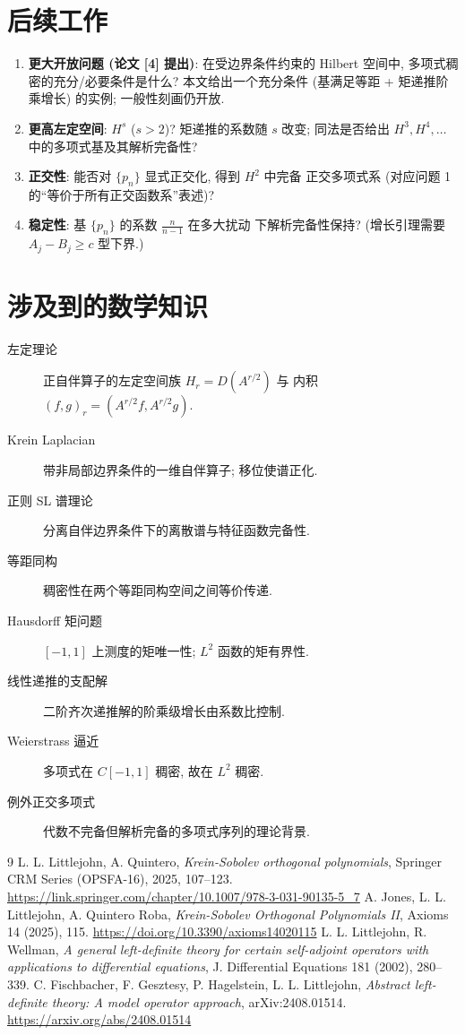 \documentclass[UTF8]{ctexart}
\begin{document}
\section{后续工作}

\begin{enumerate}
	\item \textbf{更大开放问题 (论文 [4] 提出)}: 在受边界条件约束的 Hilbert
		空间中, 多项式稠密的充分/必要条件是什么? 本文给出一个充分条件
		(基满足等距 + 矩递推阶乘增长) 的实例; 一般性刻画仍开放.
	\item \textbf{更高左定空间}: $H^s$ ($s > 2$)? 矩递推的系数随 $s$ 改变;
		同法是否给出 $H^3, H^4, \dots$ 中的多项式基及其解析完备性?
	\item \textbf{正交性}: 能否对 $\{p_n\}$ 显式正交化, 得到 $H^2$ 中完备
		正交多项式系 (对应问题 1 的``等价于所有正交函数系''表述)?
	\item \textbf{稳定性}: 基 $\{p_n\}$ 的系数 $\tfrac{n}{n-1}$ 在多大扰动
		下解析完备性保持? (增长引理需要 $A_j - B_j \geq c$ 型下界.)
\end{enumerate}

\section{涉及到的数学知识}

\begin{description}
	\item[左定理论] 正自伴算子的左定空间族 $H_r = D(A^{r/2})$ 与
		内积 $(f,g)_r = (A^{r/2}f, A^{r/2}g)$.
	\item[Krein Laplacian] 带非局部边界条件的一维自伴算子; 移位使谱正化.
	\item[正则 SL 谱理论] 分离自伴边界条件下的离散谱与特征函数完备性.
	\item[等距同构] 稠密性在两个等距同构空间之间等价传递.
	\item[Hausdorff 矩问题] $[-1,1]$ 上测度的矩唯一性; $L^2$ 函数的矩有界性.
	\item[线性递推的支配解] 二阶齐次递推解的阶乘级增长由系数比控制.
	\item[Weierstrass 逼近] 多项式在 $C[-1,1]$ 稠密, 故在 $L^2$ 稠密.
	\item[例外正交多项式] 代数不完备但解析完备的多项式序列的理论背景.
\end{description}

\begin{thebibliography}{9}
 L. L. Littlejohn, A. Quintero, \emph{Krein-Sobolev orthogonal
	polynomials}, Springer CRM Series (OPSFA-16), 2025, 107--123.
	\url{https://link.springer.com/chapter/10.1007/978-3-031-90135-5_7}
 A. Jones, L. L. Littlejohn, A. Quintero Roba, \emph{Krein-Sobolev
	Orthogonal Polynomials II}, Axioms 14 (2025), 115.
	\url{https://doi.org/10.3390/axioms14020115}
 L. L. Littlejohn, R. Wellman, \emph{A general left-definite theory
	for certain self-adjoint operators with applications to differential equations},
	J. Differential Equations 181 (2002), 280--339.
 C. Fischbacher, F. Gesztesy, P. Hagelstein, L. L. Littlejohn,
	\emph{Abstract left-definite theory: A model operator approach}, arXiv:2408.01514.
	\url{https://arxiv.org/abs/2408.01514}
\end{thebibliography}
\end{document}
